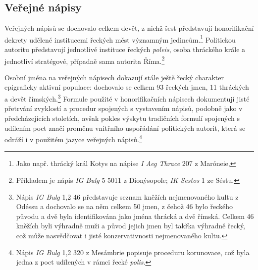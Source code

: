 
\subsection[veřejné-nápisy-10]{Veřejné nápisy}

Veřejných nápisů se dochovalo celkem devět, z nichž šest představují honorifikační dekrety udělené institucemi řeckých měst významným jedincům.\footnote{Jako např. thrácký král Kotys na nápise {\em I Aeg Thrace} 207 z Maróneie,} Politickou autoritu představují jednotlivé instituce řeckých {\em poleis}, osoba thráckého krále a jednotliví stratégové, případně sama autorita Říma.\footnote{Příkladem je nápis {\em IG Bulg} 5 5011 z Dionýsopole; {\em IK Sestos} 1 ze Séstu.}

Osobní jména na veřejných nápisech dokazují stále ještě řecký charakter epigraficky aktivní populace: dochovalo se celkem 93 řeckých jmen, 11 thráckých a devět římských.\footnote{Nápis {\em IG Bulg} 1,2 46 představuje seznam kněžích nejmenovaného kultu z Odéssu a dochovalo se na něm celkem 50 jmen, z čehož 46 bylo řeckého původu a dvě byla identifikována jako jména thrácká a dvě římská. Celkem 46 kněžích byli výhradně muži a původ jejich jmen byl takřka výhradně řecký, což může nasvědčovat i jisté konzervativnosti nejmenovaného kultu.} Formule použité v honorifikačních nápisech dokumentují jisté přetrvání zvyklostí a procedur spojených s vystavením nápisů, podobně jako v předcházejících stoletích, avšak pokles výskytu tradičních formulí spojených s udílením poct značí proměnu vnitřního uspořádání politických autorit, která se odráží i v použitém jazyce veřejných nápisů.\footnote{Nápis {\em IG Bulg} 1,2 320 z Mesámbrie popisuje proceduru korunovace, což byla jedna z poct udílených v rámci řecké {\em polis}.}

